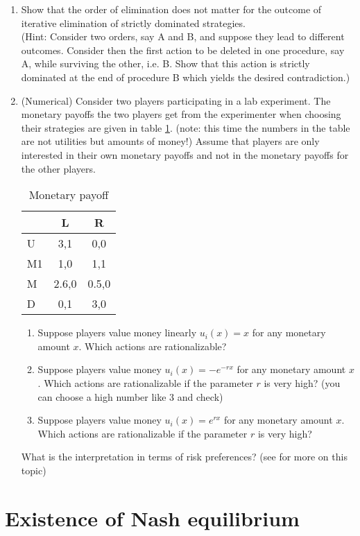 \documentclass[a4paper,12pt]{article}
\begin{document}
\begin{enumerate}
\item Show that the order of elimination does not matter for the outcome of iterative elimination of strictly dominated strategies. \\(Hint: Consider two orders, say A and B, and suppose they lead to different outcomes. Consider then the first action to be deleted in one procedure, say A, while surviving the other, i.e. B. Show that this action is strictly dominated at the end of procedure B which yields the desired contradiction.)
\item (Numerical) Consider two players participating in a lab experiment. The monetary payoffs the two players get from the experimenter when choosing their strategies are given in table \ref{tab:monRatio}. (note: this time the numbers in the table are not utilities but amounts of money!) Assume that players are only interested in their own monetary payoffs and not in the monetary payoffs for the other players.
  \begin{table}[h]
    \centering
    \begin{tabular}{l|c|c}
      & L &R\\ \hline
      U& 3,1  &0,0  \\
      M1&1,0&1,1 \\
      M&2.6,0  &0.5,0 \\
      D& 0,1 & 3,0
    \end{tabular}
    \caption{Monetary payoff}
    \label{tab:monRatio}
  \end{table}
  \begin{enumerate}
  \item Suppose players value money linearly $u_i(x)=x$ for any monetary amount $x$. Which actions are rationalizable?
  \item Suppose players value money  $u_i(x)=-e^{-r x}$ for any monetary amount $x$. Which actions are rationalizable if the parameter $r$ is very high? (you can choose a high number like $3$ and check)
     \item Suppose players value money $u_i(x)=e^{r x}$ for any monetary amount $x$. Which actions are rationalizable if the parameter $r$ is very high?
     \end{enumerate}
     What is the interpretation in terms of risk preferences? (see \cite{weinstein2016effect} for more on this topic)
\end{enumerate}


\section{Existence of Nash equilibrium}
\label{sec:nash-theorem-fixed}
\end{document}
